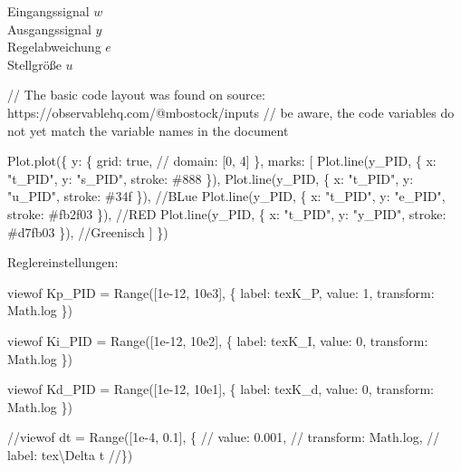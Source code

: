 \documentclass[
  letterpaper,
  DIV=11]{scrreprt}
\newenvironment{Shaded}{\begin{snugshade}}{\end{snugshade}}
\newcommand{\NormalTok}[1]{\textcolor[rgb]{0.00,0.23,0.31}{#1}}
\begin{document}
{ Eingangssignal \(w\) }\\
{ Ausgangssignal \(y\) }\\
{ Regelabweichung \(e\) }\\
{ Stellgröße \(u\) }

\begin{Shaded}
\begin{Highlighting}[]
\NormalTok{// The basic code layout was found on source: https://observablehq.com/@mbostock/inputs}
\NormalTok{// be aware, the code variables do not yet match the variable names in the document}

\NormalTok{Plot.plot(\{}
\NormalTok{  y: \{}
\NormalTok{    grid: true,}
\NormalTok{  //  domain: [0, 4]}
\NormalTok{  \},}
\NormalTok{  marks: [}
\NormalTok{    Plot.line(y\_PID, \{}
\NormalTok{      x: "t\_PID",}
\NormalTok{      y: "s\_PID",}
\NormalTok{      stroke: \textquotesingle{}\#888\textquotesingle{}}
\NormalTok{    \}),}
\NormalTok{    Plot.line(y\_PID, \{ x: "t\_PID", y: "u\_PID", stroke: \textquotesingle{}\#34f\textquotesingle{} \}), //BLue}
\NormalTok{    Plot.line(y\_PID, \{ x: "t\_PID", y: "e\_PID", stroke: \textquotesingle{}\#fb2f03\textquotesingle{} \}), //RED}
\NormalTok{    Plot.line(y\_PID, \{ x: "t\_PID", y: "y\_PID", stroke: \textquotesingle{}\#d7fb03\textquotesingle{} \}),  //Greenisch}
\NormalTok{  ]}
\NormalTok{\})}
\end{Highlighting}
\end{Shaded}

Reglereinstellungen:

\begin{Shaded}
\begin{Highlighting}[]

\NormalTok{viewof Kp\_PID = Range([1e{-}12, 10e3], \{}
\NormalTok{  label: tex\textasciigrave{}K\_P\textasciigrave{},}
\NormalTok{  value: 1,}
\NormalTok{  transform: Math.log}
\NormalTok{\})}

\NormalTok{viewof Ki\_PID = Range([1e{-}12, 10e2], \{}
\NormalTok{  label: tex\textasciigrave{}K\_I\textasciigrave{},}
\NormalTok{  value: 0,}
\NormalTok{  transform: Math.log}
\NormalTok{\})}

\NormalTok{viewof Kd\_PID = Range([1e{-}12, 10e1], \{}
\NormalTok{  label: tex\textasciigrave{}K\_d\textasciigrave{},}
\NormalTok{  value: 0,}
\NormalTok{  transform: Math.log}
\NormalTok{\})}

\NormalTok{//viewof dt = Range([1e{-}4, 0.1], \{}
\NormalTok{//  value: 0.001,}
\NormalTok{//  transform: Math.log,}
\NormalTok{//  label: tex\textasciigrave{}\textbackslash{}Delta t\textasciigrave{}}
\NormalTok{//\})}
\end{Highlighting}
\end{Shaded}
\end{document}
